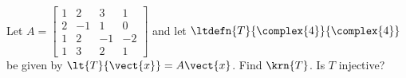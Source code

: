 Let 
$A = 
\begin{bmatrix}  
1 & 2 & 3 & 1 \\ 
2 & -1 & 1 & 0 \\ 
1 & 2 & -1 & -2 \\ 
1 & 3 & 2 & 1 
\end{bmatrix}$ 
and let 
$\ltdefn{T}{\complex{4}}{\complex{4}}$ be given by $\lt{T}{\vect{x}}=A\vect{x}$.  
Find $\krn{T}$.  
Is $T$ injective?
